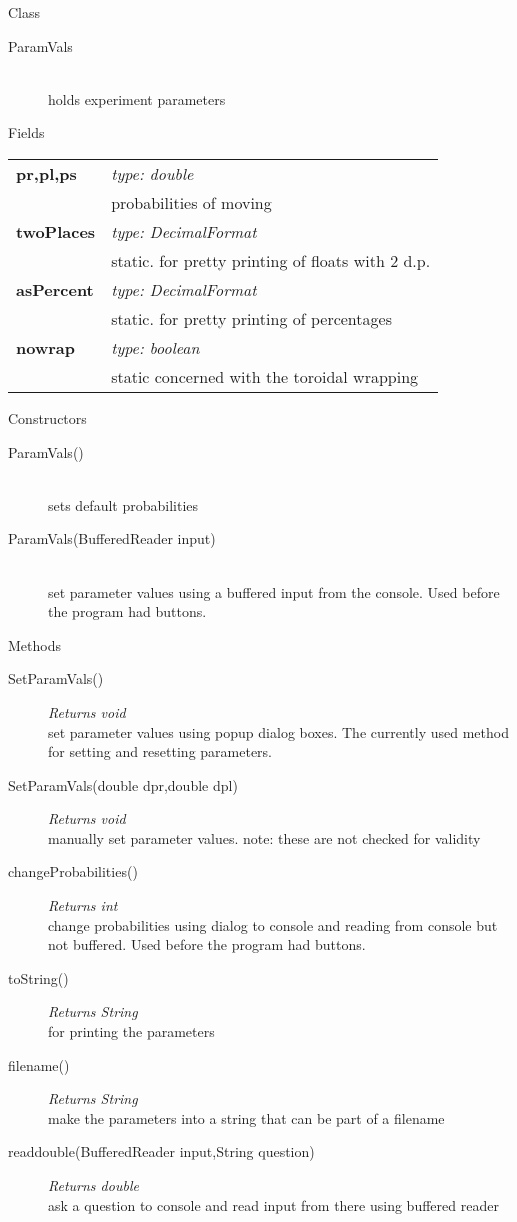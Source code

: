 \documentclass[11pt,a4paper]{article}
\newcommand \bt{\begin{longtable}{p{0.25\textwidth}p{0.74\textwidth}}}
\newcommand \et{\end{longtable}}
\newcommand{\hs}{\hspace{0.5cm}}
\newenvironment{di}
{\begin{flushright}
\begin{minipage}{0.95\textwidth}
\begin{description}
}
{\end{description}
\end{minipage}
\end{flushright}
}
\begin{document}
\noindent
\colorbox{classbg}{\parbox{1.0\textwidth}{\Large{Class}}}
\begin{di}
\item[\large{ParamVals}]\qquad\\
holds experiment parameters
\end{di}
\colorbox{fieldbg}{\parbox{1.0\textwidth}{\Large{Fields}}}\vspace{0.5cm}
\bt
\hs \textbf{pr,pl,ps} & \emph{type: double}\\
& \hs probabilities of moving\\
\hs \textbf{twoPlaces} & \emph{type: DecimalFormat}\\
& \hs static. for pretty printing of floats with 2 d.p.\\
\hs \textbf{asPercent} & \emph{type: DecimalFormat}\\
& \hs static. for pretty printing of percentages\\
\hs \textbf{nowrap} & \emph{type: boolean}\\
& \hs static concerned with the toroidal wrapping\\
\et
\noindent\colorbox{conbg}{\parbox{1.0\textwidth}{\Large{Constructors}}}
\begin{di}
\item[{ParamVals()}]\qquad\\
sets default probabilities
\item[{ParamVals(BufferedReader input)}]\qquad\\
set parameter values using a buffered input from the console. Used before the program had buttons.
\end{di}
\colorbox{descriptbg}{\parbox{1.0\textwidth}{\Large{Methods}}}
\begin{di}
\item[{SetParamVals()}]\emph{Returns void}\\
set parameter values using popup dialog boxes. The currently used method for setting and resetting parameters.\\
\item[{SetParamVals(double dpr,double dpl)}]\emph{Returns void}\\
manually set parameter values. note: these are not checked for validity\\
\item[{changeProbabilities()}]\emph{Returns int}\\
change probabilities using dialog to console and reading from console but not buffered. Used before the program had buttons.\\
\item[{toString()}]\emph{Returns String}\\
for printing the parameters\\
\item[{filename()}]\emph{Returns String}\\
make the parameters into a string that can be part of a filename\\
\item[{readdouble(BufferedReader input,String question)}]\emph{Returns double}\\
ask a question to console and read input from there using buffered reader\\
\end{di}
\end{document}
